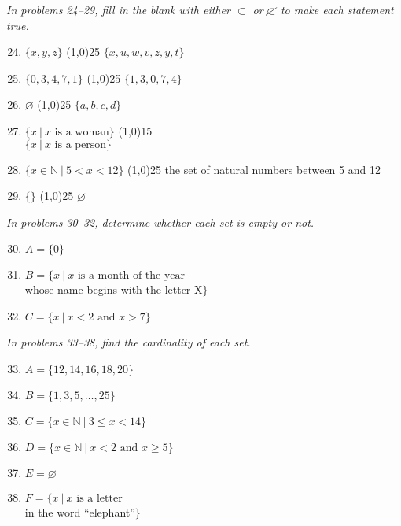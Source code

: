 \emph{In problems 24--29, fill in the blank with either $\subset$ or $\cancel{\subset}$ to make each statement true.}
\begin{enumerate}
\setcounter{enumi}{23}

\item $\{x,y,z\}$ \line(1,0){25} $\{x,u,w,v,z,y,t\}$ \answer{$\subset$}

\item $\{0,3,4,7,1\}$ \line(1,0){25} $\{1,3,0,7,4\}$ \answer{$\cancel{\subset}$}

\item $\varnothing$ \line(1,0){25} $\{a,b,c,d\}$ \answer{$\subset$}

\item $\{x\ |\ x \textrm{ is a woman}\}$ \line(1,0){15}\\ $\{x\ |\ x \textrm{ is a person}\}$ \answer{$\subset$}

\item $\{x \in \mathbb{N}\ |\ 5 < x < 12\}$ \line(1,0){25} the set of natural numbers between 5 and 12 \answer{$\cancel{\subset}$}

\item $\{\}$ \line(1,0){25} $\varnothing$ \answer{$\cancel{\subset}$}
\end{enumerate}

\emph{In problems 30--32, determine whether each set is empty or not.}
\begin{enumerate}
\setcounter{enumi}{29}

\item $A=\{0\}$ 

\item $B=\{x\ |\ x \textrm{ is a month of the year}$\\ whose name begins with the letter X$\}$ 

\item $C=\{x\ |\ x < 2 \textrm{ and } x > 7\}$ 
\end{enumerate}

\emph{In problems 33--38, find the cardinality of each set.}
\begin{enumerate}
\setcounter{enumi}{32}

\item $A=\{12,14,16,18,20\}$ 

\item $B=\{1,3,5,\ldots,25\}$ 

\item $C=\{x \in \mathbb{N}\ |\ 3 \leq x < 14\}$ 

\item $D=\{x \in \mathbb{N}\ |\ x < 2 \textrm{ and } x \geq 5\}$ 

\item $E=\varnothing$ 

\item $F=\{x\ |\ x \textrm{ is a letter}$\\ in the word ``elephant''$\}$ 
\end{enumerate}